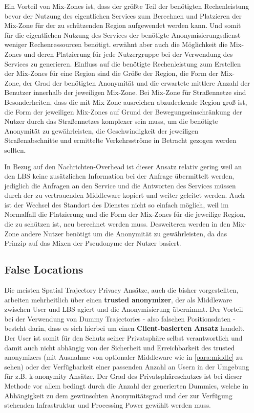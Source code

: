 Ein Vorteil von Mix-Zones ist, dass der größte Teil der benötigten Rechenleistung bevor der Nutzung  des eigentlichen Services zum Berechnen und Platzieren der Mix-Zone für der zu schützenden Region aufgewendet werden kann. Und somit für die eigentlichen Nutzung des Services der benötigte Anonymisierungsdienst weniger Rechenressourcen benötigt. \cite{Beresford2003} erwähnt aber auch die Möglichkeit die Mix-Zones und deren Platzierung für jede Nutzergruppe bei der Verwendung des Services zu generieren. Einfluss auf die benötigte Rechenleistung zum Erstellen der Mix-Zones für eine Region sind die Größe der Region, die Form der Mix-Zone, der Grad der benötigten Anonymität und die erwartete mittlere Anzahl der Benutzer innerhalb der  jeweiligen Mix-Zone. Bei Mix-Zone für Straßennetze sind Besonderheiten, dass die mit Mix-Zone ausreichen abzudeckende Region groß ist, die Form der jeweiligen Mix-Zones auf Grund der Bewegungseinschränkung der Nutzer durch das Straßennetzes komplexer sein  muss, um die benötigte Anonymität zu gewährleisten, die Geschwindigkeit der jeweiligen Straßenabschnitte  und ermittelte Verkehrsströme in Betracht gezogen werden sollten. 

In Bezug auf den Nachrichten-Overhead ist dieser Ansatz relativ gering weil an den LBS keine zusätzlichen Information bei der Anfrage übermittelt werden, jediglich die Anfragen an den Service und die Antworten des Services müssen durch der zu vertrauenden Middleware kopiert und weiter geleitet werden. Auch ist  der Wechsel des Standort des Dienstes nicht so einfach möglich, weil im Normalfall die Platzierung und die Form der Mix-Zones für die jeweilige Region, die zu schützen ist, neu berechnet werden muss. Desweiteren werden in den Mix-Zone andere Nutzer benötigt um die Anonymität zu gewährleisten, da das Prinzip auf das Mixen der Pseudonyme der Nutzer basiert. 

\subsection{False Locations}
Die meisten Spatial Trajectory Privacy Ansätze, auch die bisher vorgestellten, arbeiten mehrheitlich über einen \textbf{trusted anonymizer}, der als Middleware zwischen User und LBS agiert und die Anonymisierung übernimmt. Der Vorteil bei der Verwendung von Dummy Trajectories - also falschen Positionsdaten - besteht darin, dass es sich hierbei um einen \textbf{Client-basierten Ansatz} handelt. Der User ist somit für den Schutz seiner Privatsphäre selbst verantwortlich und damit auch nicht abhängig von der Sicherheit und Erreichbarkeit des trusted anonymizers (mit Ausnahme von optionaler Middleware wie in \ref{para:middle} zu sehen) oder der Verfügbarkeit einer passenden Anzahl an Usern in der Umgebung für z.B. k-anonymity Ansätze. Der Grad des Privatsphäreschutzes ist bei dieser Methode vor allem bedingt durch die Anzahl der generierten Dummies, welche in Abhängigkeit zu dem gewünschten Anonymitätsgrad und der zur Verfügung stehenden Infrastruktur und Processing Power gewählt werden muss.

